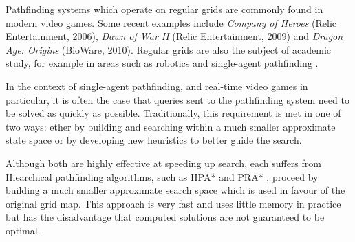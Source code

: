 Pathfinding systems which operate on regular grids are commonly found in modern video games.
Some recent examples include \emph{Company of Heroes} (Relic Entertainment, 2006), \emph{Dawn of War II} (Relic
Entertainment, 2009) and \emph{Dragon Age: Origins} (BioWare, 2010).
Regular grids are also the subject of academic study, for example in areas such as robotics \cite{latombe92} and
single-agent pathfinding \cite{yap02,botea04,sturtevant07, harabor08}.
\par
In the context of single-agent pathfinding, and real-time video games in particular, it is often the case that queries sent to
the pathfinding system  need to be solved as quickly as possible.
Traditionally, this requirement is met in one of two ways: ether by building and searching within a much smaller approximate
state space or by developing new heuristics to better guide the search.

Although both are highly effective at speeding up search, each suffers from 
Hiearchical pathfinding algorithms, such as HPA* \cite{botea04} and PRA* \cite{sturtevant05}, proceed by
building a much smaller approximate search space which is used in favour of the original grid map.
This approach is very fast and uses little memory in practice but has the disadvantage that computed solutions are not
guaranteed to be optimal. 

